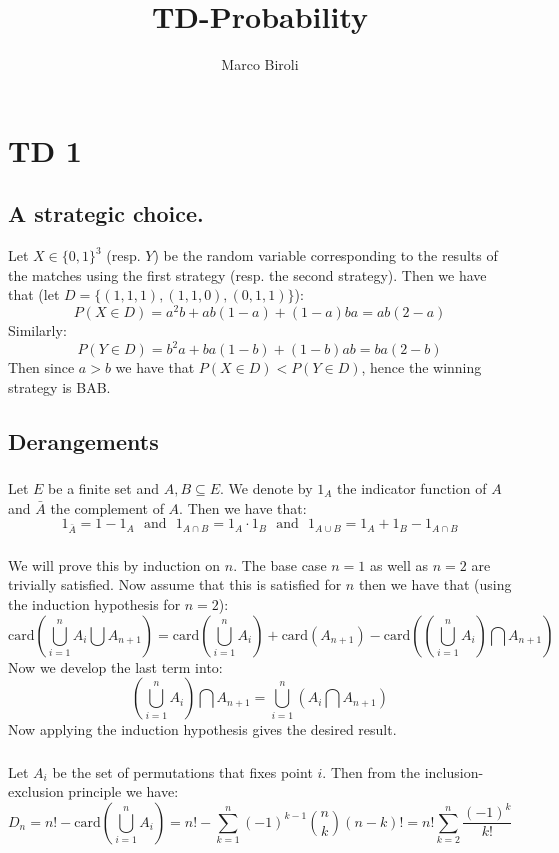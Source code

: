 \documentclass[10pt,a4paper]{book}
\author{Marco Biroli}
\title{TD-Probability}
\newcommand{\card}{\text{card}}
\begin{document}
\maketitle
\chapter{TD 1}
\section{A strategic choice.}
Let $X \in \{0, 1\}^3$ (resp. $Y$) be the random variable corresponding to the results of the matches using the first strategy (resp. the second strategy). Then we have that (let $D = \{ (1, 1, 1), (1, 1, 0), (0, 1, 1) \}$):
\[
P(X \in D ) = a^2 b + a b (1-a) + (1-a) b a = ab(2 - a)  
\]  
Similarly:
\[
P(Y \in D) = b^2 a + b a (1-b) + (1-b) a b = ba(2 - b)  
\]
Then since $a > b$ we have that $P(X \in D) < P(Y \in D)$, hence the winning strategy is BAB.

\section{Derangements}
\subsection{}
Let $E$ be a finite set and $A, B \subseteq E$. We denote by $1_A$ the indicator function of $A$ and $\bar{A}$ the complement of $A$. Then we have that:
\[
1_{\bar{A}} = 1 - 1_A \mbox{~~and~~} 1_{A \cap B} = 1_A \cdot 1_B \mbox{~~and~~} 1_{A \cup B} = 1_A + 1_B - 1_{A \cap B}
\]
\subsection{}
We will prove this by induction on $n$. The base case $n = 1$ as well as $n = 2$ are trivially satisfied. Now assume that this is satisfied for $n$ then we have that (using the induction hypothesis for $n = 2$):
\[
\card\left( \bigcup_{i = 1}^n A_i \bigcup A_{n+1} \right) = \card\left( \bigcup_{i = 1}^n A_i  \right) + \card(A_{n+1}) - \card\left( \left(\bigcup_{i = 1}^n A_i\right) \bigcap A_{n+1} \right)
\] 
Now we develop the last term into:
\[
\left(\bigcup_{i = 1}^n A_i\right) \bigcap A_{n+1} = \bigcup_{i = 1}^n \left( A_i \bigcap A_{n+1} \right)
\]
Now applying the induction hypothesis gives the desired result.

\subsection{}
Let $A_i$ be the set of permutations that fixes point $i$. Then from the inclusion-exclusion principle we have:
\[
D_n = n! - \card\left( \bigcup_{i = 1}^n A_i  \right) = n! - \sum_{k = 1}^{n} (-1)^{k-1} \binom{n}{k}(n-k)! = n! \sum_{k = 2}^n \frac{(-1)^k}{k!}
\]
\end{document}
